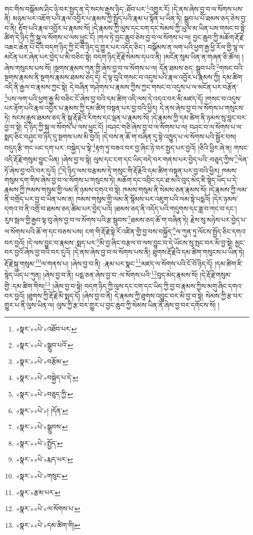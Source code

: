 གང་གིས་བསྒོམས་ཤིང་ཉེ་བར་སྤྱད་ན་དེ་སངས་རྒྱས་ཉིད་:ཐོབ་པར་\footnote{«སྣར་»«པེ་»འཐོབ་པར་}འགྱུར་རོ། །དེ་ནས་ཞེས་བྱ་བ་ལ་སོགས་པས་ནི། མཉམ་པར་འཇོག་པའི་རྣལ་འབྱོར་པ་རྣམས་ཀྱི་སྤྱོད་པའི་རྣམ་པ་སྟོན་པ་ཡིན་ཏེ། སྒྲུབ་པ་པོ་ཐམས་ཅད་ཅེས་བྱ་བ་ནི། རྟོག་པའི་རྣལ་འབྱོར་པ་རྣམས་སོ། །དེ་རྣམས་ཀྱི་ལུས་དང་ངག་དང་སེམས་ཀྱི་ཡུལ་མ་ཡིན་པས་གསང་བ་སྟེ་ཚིག་དེ་ཉིད་ཀྱི་སྐུ་ལ་སོགས་པ་ལས་ཕྱུང་ངོ། །གལ་ཏེ་བྱང་ཆུབ་ཅེས་བྱ་བ་ལ་སོགས་པ་ལ། བྱང་ཆུབ་ཀྱི་མཆོག་རྡོ་རྗེ་འཆང་ཆེན་པོ་དེའི་བདག་ཉིད་ཀྱི་ངོ་བོ་ཉིད་དུ་གྱུར་པར་འདོད་ཅིང་། བསྒོམས་ན་ལག་པའི་ཕྱག་རྒྱ་ཕྱི་རོལ་གྱི་ལྷ་ལ་མངོན་པར་ཞེན་པར་བྱེད་པ་མི་བཅིང་སྟེ། བདག་ཉིད་རྡོ་རྗེ་སེམས་དཔའ་ནི། །མངོན་སུམ་ཡིན་ན་གཞན་ཅི་ཚོལ། །ཞེས་གསུངས་པས་སོ། །སྔགས་རྣམས་ཀུན་གྱི་ཞེས་བྱ་བ་ལ་སོགས་པ་ལ། དོན་ཐམས་ཅད་:སྒྲུབ་པའི་\footnote{«སྣར་»«པེ་»སྒྲུབ་པའོ་}གསང་བའི་སྔགས་རྣམས་ནི་སྔགས་རྣམས་ཐམས་ཅད་དེ། དེ་ལྟ་བུའི་གསང་བ་འདུས་པའི་རྣལ་འབྱོར་པ་རྣམས་ཀྱི། དམ་ཚིག་འདི་ནི་རྒྱལ་བ་རྣམས་ཀྱང་སྟེ། དེ་བཞིན་གཤེགས་པ་རྣམས་ཀྱིས་ཀྱང་གསང་བ་འདུས་པ་ལ་མངོན་པར་བརྩོན་\footnote{«སྣར་»«པེ་»བརྩོམ་}པས་ལག་པའི་ཕྱག་རྒྱ་མི་བཅིང་ངོ་ཞེས་བྱ་བའི་དམ་ཚིག་འདི་ལས་དེ་འདའ་བར་མི་མཛད་དོ། །གསང་བ་འདུས་པར་རྟོག་པའི་རྣལ་འབྱོར་པ་རྣམས་ཀྱི་དམ་ཚིག་བསྟན་པར་བྱ་བའི་ཕྱིར། དེ་ནས་ཞེས་བྱ་བ་ལ་སོགས་པ་གསུངས་ཏེ། སངས་རྒྱས་ཐམས་ཅད་ནི་སྐུ་རྡོ་རྗེའི་རིགས་དང་ལྡན་པ་རྣམས་སོ། །དེ་རྣམས་ཀྱི་དམ་ཚིག་ནི་ཉམས་སུ་བླང་བར་བྱ་བ་སྟེ། དེ་ཉིད་ཀྱི་སྐུ་ལ་སོགས་པ་ལས་ཕྱུང་ངོ། །བཤང་གཅི་ཞེས་བྱ་བ་ལ་སོགས་པ་ལ། བཤང་བ་ལ་སོགས་པ་ལ་སྨད་ཅིང་བཤུང་བ་ཉིད་དུ་སྔགས་པས་མི་བྱའོ། །དེ་བས་ན་ཆོ་ག་བཞིན་དུ་སྟེ་འཁྱུད་པ་ལ་སོགས་པའི་སྦྱོར་བས། བདུད་རྩི་གང་ཡང་དག་པར་:བསྐྱེད་པ་སྟེ་\footnote{«སྣར་»«པེ་»བསྐྱེད་པ་དེ་}རྟག་ཏུ་བཟའ་བར་བྱ་ཞིང་ཉེ་བར་སྤྱད་པར་བྱའོ། །ཅིའི་ཕྱིར་ཞེ་ན། གསང་འདི་རྡོ་རྗེ་གསུམ་བྱུང་ཡིན། །ཞེས་བྱ་བ་སྟེ། ལུས་དང་ངག་དང་ཡིད་བདེ་བར་གནས་པར་བྱེད་པའི་:བཅུད་ཀྱིས་\footnote{«སྣར་»«པེ་»བཅུད་ཀྱི་}ལེན་ཏོ་ཞེས་བྱ་བའི་བར་དུའོ། །\footnote{«སྣར་»«པེ་»། །དོན་}དེ་ཉིད་ལས་བརྩམས་ཏེ་གསུང་གི་རྡོ་རྗེའི་དམ་ཚིག་བསྟན་པར་བྱ་བའི་ཕྱིར། ཁམས་གསུམ་དག་གིས་ཞེས་བྱ་བ་ལ་སོགས་པ་གསུངས་ཏེ། མཆོག་དང་འབྲིང་དང་ཐ་མའི་བུད་མེད་ཇི་སྙེད་ཡོད་པ་དེ་རྣམས་ཀྱི་ཁམས་གསུམ་གྱི་ལམ་ནི་ཉམས་དགའ་བ་སྟེ། ཁམས་གསུམ་ནི་སེམས་ཅན་རྣམས་སོ། །དེ་རྣམས་ཀྱི་ལམ་ནི་བགྲོད་པར་བྱ་བ་ཡིན་པས་ན། ཁམས་གསུམ་གྱི་ལམ་ནི་སྙོམས་པར་འཇུག་པའི་ལམ་སྟེ་པདྨའོ། །དེར་ཉམས་དགའ་བ་ནི་འགྲོ་བ་ཐམས་ཅད་ཚིམ་པར་བྱེད་པའོ། །ཐམས་ཅད་ནི་འདོད་པའི་གདུགས་དང་ཟླ་བ་གང་བ་དང་། རུས་སྦལ་གྱི་རྒྱབ་ལྟ་བུ་ཞེས་བྱ་བ་ལ་སོགས་པའི་རྩ་སྦུབས་\footnote{«སྣར་»«པེ་»སྒྲུབས་}ཐམས་ཅད་ཆོ་ག་བཞིན་ཏེ། རྗེས་སུ་མཉེས་པར་བྱེད་པ་ལ་སོགས་པའི་ཆོ་ག་དང་བཅས་པས། ངག་གི་རྡོ་རྗེ་སྟེ་རོ་འཛིན་གྱི་བྱ་བས་བསྐྱོད་\footnote{«སྣར་»«པེ་»སྤྱོད་}ལ་ཀུན་ཏུ་ལོངས་སྤྱོད་ཅིང་དགའ་བར་བྱའོ། །དེ་ལས་བྱུང་བ་རྣམས་:སྨད་པར་\footnote{«སྣར་»«པེ་»རྨད་པར་}མི་བྱ་ཞིང་བརྩལ་བ་ལས་བྱུང་བ་དེ་ཡོངས་སུ་སྤང་བར་མི་བྱ་སྟེ། མྱང་བར་བྱའོ་ཞེས་བྱ་བའི་བར་དུའོ། །དེ་ནས་ཞེས་བྱ་བ་ལ་སོགས་པས་ནི། ཐུགས་རྡོ་རྗེའི་དམ་ཚིག་གསུངས་པ་ཡིན་ཏེ། རྡོ་རྗེ་སྐུ་གསུམ་\footnote{«སྣར་»«པེ་»གསུང་}ལ་གནས་པ། །ཞེས་བྱ་བ་ནི། :རྣམ་པར་སྣང་\footnote{«སྣར་»རྩམ་པར་}མཛད་ལ་སོགས་པའི་ངོ་བོ་ཉིད་དོ། །དམ་ཚིག་ཇི་སྙེད་ཡོད་པ་ཀུན། །ཞེས་བྱ་བ་ནི། པདྨ་ཅན་ཞེས་བྱ་བ་:ལ་སོགས་པའི་\footnote{«སྣར་»«པེ་»ལ་སོགས་པ་}བུད་མེད་རྣམས་སོ། །དེ་རྡོ་རྗེ་གསུམ་གྱི་:དམ་ཚིག་གིས།\footnote{«སྣར་»«པེ་»དམ་ཚིག་གི།} །ཞེས་བྱ་བ་སྟེ། བདག་ཉིད་ཀྱི་ལུས་དང་ངག་དང་ཡིད་ཀྱི་བྱ་བ་རྣམས་ཀྱིས་མགུ་ཞིང་དགའ་བར་བྱའོ། །ཐུགས་ཀྱི་རྡོ་རྗེ་མི་སྨད་དོ། །ཞེས་བྱ་བ་ནི། དེ་རྣམས་ཀྱི་ཐུགས་འབྱུང་བར་མི་བྱ་བ་སྟེ། སེམས་ཀྱི་རྩ་བར་གྱུར་པ་ནི་ལུས་ཡིན་ལ། ལུས་ཀྱི་རྩ་བར་གྱུར་པ་བྱང་ཆུབ་ཀྱི་སེམས་ཡིན་ནོ་ཞེས་བྱ་བར་དགོངས་སོ། །
